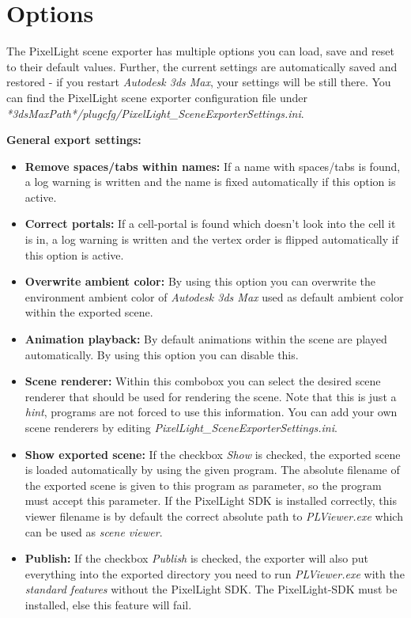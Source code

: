 \chapter{Options}
The PixelLight scene exporter has multiple options you can load, save and reset to their default values. Further, the current settings are automatically saved and restored - if you restart \emph{Autodesk 3ds Max}, your settings will be still there. You can find the PixelLight scene exporter configuration file under \emph{*3dsMaxPath*/plugcfg/PixelLight\_SceneExporterSettings.ini}.

\textbf{General export settings:}
\begin{itemize}
\item{\textbf{Remove spaces/tabs within names:} If a name with spaces/tabs is found, a log warning is written and the name is fixed automatically if this option is active.}
\item{\textbf{Correct portals:} If a cell-portal is found which doesn't look into the cell it is in, a log warning is written and the vertex order is flipped automatically if this option is active.}
\item{\textbf{Overwrite ambient color:} By using this option you can overwrite the environment ambient color of \emph{Autodesk 3ds Max} used as default ambient color within the exported scene.}
\item{\textbf{Animation playback:} By default animations within the scene are played automatically. By using this option you can disable this.}
\item{\textbf{Scene renderer:} Within this combobox you can select the desired scene renderer that should be used for rendering the scene. Note that this is just a \emph{hint}, programs are not forced to use this information. You can add your own scene renderers by editing \emph{PixelLight\_SceneExporterSettings.ini}.}
\item{\textbf{Show exported scene:} If the checkbox \emph{Show} is checked, the exported scene is loaded automatically by using the given program. The absolute filename of the exported scene is given to this program as parameter, so the program must accept this parameter. If the PixelLight SDK is installed correctly, this viewer filename is by default the correct absolute path to \emph{PLViewer.exe} which can be used as \emph{scene viewer}.}
\item{\textbf{Publish:} If the checkbox \emph{Publish} is checked, the exporter will also put everything into the exported directory you need to run \emph{PLViewer.exe} with the \emph{standard features} without the PixelLight SDK. The PixelLight-SDK must be installed, else this feature will fail.}
\end{itemize}


